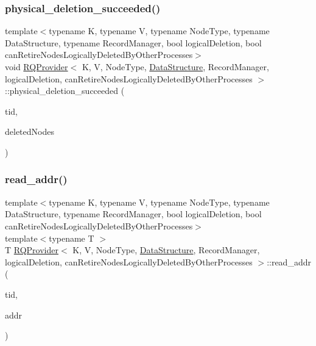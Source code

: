 \mbox{\label{classRQProvider_a1bcce8dc80c1661b549a5ec6f9ee6d15}} 
\subsubsection{\texorpdfstring{physical\+\_\+deletion\+\_\+succeeded()}{physical\_deletion\_succeeded()}\hspace{0.1cm}{\footnotesize\ttfamily [5/5]}}
{\footnotesize\ttfamily template$<$typename K, typename V, typename Node\+Type, typename Data\+Structure, typename Record\+Manager, bool logical\+Deletion, bool can\+Retire\+Nodes\+Logically\+Deleted\+By\+Other\+Processes$>$ \\
void \hyperlink{classRQProvider}{R\+Q\+Provider}$<$ K, V, Node\+Type, \hyperlink{classDataStructure}{Data\+Structure}, Record\+Manager, logical\+Deletion, can\+Retire\+Nodes\+Logically\+Deleted\+By\+Other\+Processes $>$\+::physical\+\_\+deletion\+\_\+succeeded (\begin{DoxyParamCaption}\item[{const int}]{tid,  }\item[{Node\+Type $\ast$const $\ast$const}]{deleted\+Nodes }\end{DoxyParamCaption})\hspace{0.3cm}{\ttfamily [inline]}}

\mbox{\label{classRQProvider_aa6dcae307b83ce0dc7890155f81659a2}} 
\subsubsection{\texorpdfstring{read\+\_\+addr()}{read\_addr()}\hspace{0.1cm}{\footnotesize\ttfamily [1/5]}}
{\footnotesize\ttfamily template$<$typename K, typename V, typename Node\+Type, typename Data\+Structure, typename Record\+Manager, bool logical\+Deletion, bool can\+Retire\+Nodes\+Logically\+Deleted\+By\+Other\+Processes$>$ \\
template$<$typename T $>$ \\
T \hyperlink{classRQProvider}{R\+Q\+Provider}$<$ K, V, Node\+Type, \hyperlink{classDataStructure}{Data\+Structure}, Record\+Manager, logical\+Deletion, can\+Retire\+Nodes\+Logically\+Deleted\+By\+Other\+Processes $>$\+::read\+\_\+addr (\begin{DoxyParamCaption}\item[{const int}]{tid,  }\item[{T volatile $\ast$const}]{addr }\end{DoxyParamCaption})\hspace{0.3cm}{\ttfamily [inline]}}

